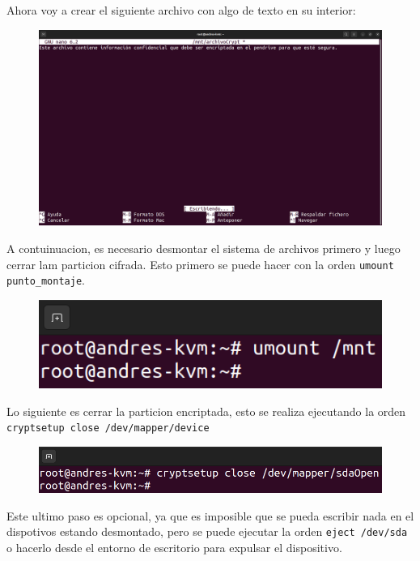 \documentclass{article}
\begin{document}
Ahora voy a crear el siguiente archivo con algo de texto en su interior:

\begin{figure}[H]
    \includegraphics[width=\textwidth]{imagenes/Captura desde 2022-10-30 10-59-27.png}
\end{figure}

A contuinuacion, es necesario desmontar el sistema de archivos primero y luego cerrar lam particion cifrada. Esto primero se puede hacer con la orden \verb|umount punto_montaje|.

\begin{figure}[H]
    \includegraphics[width=\textwidth]{imagenes/Captura desde 2022-10-30 11-00-34.png}
\end{figure}

Lo siguiente es cerrar la particion encriptada, esto se realiza ejecutando la orden \verb|cryptsetup close /dev/mapper/device|


\begin{figure}[H]
    \includegraphics[width=\textwidth]{imagenes/Captura desde 2022-10-30 11-02-02.png}
\end{figure}

Este ultimo paso es opcional, ya que es imposible que se pueda escribir nada en el dispotivos estando desmontado, pero se puede ejecutar la orden \verb|eject /dev/sda| o hacerlo desde el entorno de escritorio para expulsar el dispositivo.
\end{document}
